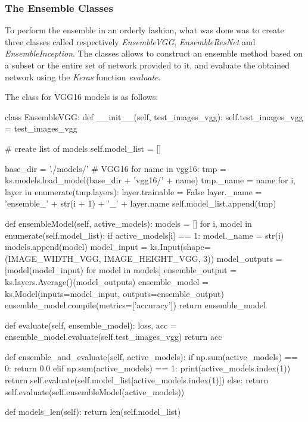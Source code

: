 \subsubsection{The Ensemble Classes}
To perform the ensemble in an orderly fashion, what was done was to create three classes called respectively \textit{EnsembleVGG}, \textit{EnsembleResNet} and \textit{EnsembleInception}. The classes allows to construct an ensemble method based on a subset or the entire set of network provided to it, and evaluate the obtained network using the \textit{Keras} function \textit{evaluate}.

The class for VGG16 models is as follows:

\begin{python}
class EnsembleVGG:
    def __init__(self, test_images_vgg):
        self.test_images_vgg = test_images_vgg

        # create list of models
        self.model_list = []

        base_dir = './models/'
        # VGG16
        for name in vgg16:
            tmp = ks.models.load_model(base_dir + 'vgg16/' + name)
            tmp._name = name
            for i, layer in enumerate(tmp.layers):
                layer.trainable = False
                layer._name = 'ensemble_' + str(i + 1) + '_' + layer.name
            self.model_list.append(tmp)


    def ensembleModel(self, active_models):
        models = []
        for i, model in enumerate(self.model_list):
            if active_models[i] == 1:
                model._name = str(i)
                models.append(model)
        model_input = ks.Input(shape=(IMAGE_WIDTH_VGG, IMAGE_HEIGHT_VGG, 3))
        model_outputs = [model(model_input) for model in models]
        ensemble_output = ks.layers.Average()(model_outputs)
        ensemble_model = ks.Model(inputs=model_input, outputs=ensemble_output)
        ensemble_model.compile(metrics=['accuracy'])
        return ensemble_model

    def evaluate(self, ensemble_model):
        loss, acc = ensemble_model.evaluate(self.test_images_vgg)
        return acc

    def ensemble_and_evaluate(self, active_models):
        if np.sum(active_models) == 0:
            return 0.0
        elif np.sum(active_models) == 1:
            print(active_models.index(1))
            return self.evaluate(self.model_list[active_models.index(1)])
        else:
            return self.evaluate(self.ensembleModel(active_models))

    def models_len(self):
        return len(self.model_list)
\end{python}

